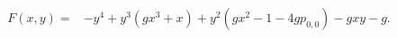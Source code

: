 \begin{align}
    \label{curve:quartic_ggg}
    F(x,y)={} & -y^{4}+y^{3}\left(gx^{3} + x\right)+y^{2}\left(gx^{2} -1-4g p_{0,0}\right)-gxy-g.
\end{align}
